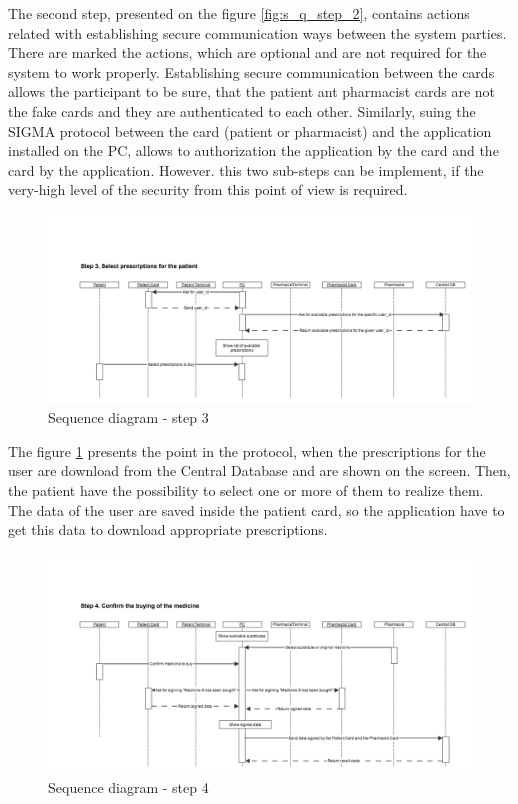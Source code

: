 The second step, presented on the figure \ref{fig:s_q_step_2}, contains actions related with establishing secure communication ways between the system parties. There are marked the actions, which are optional and are not required for the system to work properly. Establishing secure communication between the cards allows the participant to be sure, that the patient ant pharmacist cards are not the fake cards and they are authenticated to each other.
Similarly, suing the SIGMA protocol between the card (patient or pharmacist) and the application installed on the PC, allows to authorization the application by the card and the card by the application. However. this two sub-steps can be implement, if the very-high level of the security from this point of view is required. 

\begin{figure}	
	\hspace*{-1.5in}
    \includegraphics[scale=0.45]{s_d_3.png}
    \caption{Sequence diagram - step 3}
    \label{fig:s_q_step_3}
\end{figure} 

The figure \ref{fig:s_q_step_3} presents the point in the protocol, when the prescriptions for the user are download from the Central Database and are shown on the screen. Then, the patient have the possibility to select one or more of them to realize them. The data of the user are saved inside the patient card, so the application have to get this data to download appropriate prescriptions. 

\begin{figure}	
	\hspace*{-1.5in}
    \includegraphics[scale=0.45]{s_d_4.png}
    \caption{Sequence diagram - step 4}
    \label{fig:s_q_step_4}
\end{figure} 



